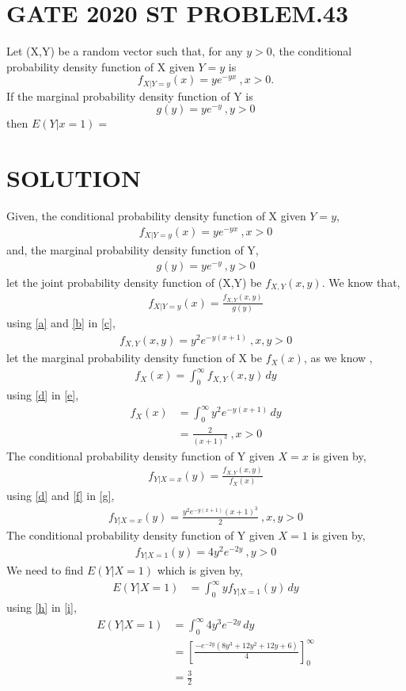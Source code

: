 \documentclass[journal,12pt,twocolumn]{IEEEtran}
\begin{document}
\section{GATE 2020 ST PROBLEM.43}
Let (X,Y) be a random vector such that, for any $y>0$, the conditional probability density function of X given $Y=y$ is $$f_{X|Y=y}(x)=ye^{-yx} \:,x>0. $$ If the marginal probability density function of Y is $$g(y)=ye^{-y}\:,y>0$$ then $E(Y|x=1)=$
\section{SOLUTION}
Given,
the conditional probability density function of X given $Y=y$,
\begin{align}
f_{X|Y=y}(x)=ye^{-yx} \:,x>0 \label{a}
\end{align}
and, the marginal probability density function of Y,
\begin{align}
g(y)=ye^{-y}\:,y>0 \label{b}
\end{align}
let the joint probability density function of (X,Y) be $f_{X,Y}(x,y)$.
We know that,
\begin{align}
f_{X|Y=y}(x)=\frac{f_{X,Y}(x,y)}{g(y)}  \label{c}
\end{align}
using \eqref{a} and \eqref{b} in \eqref{c},
\begin{align}
f_{X,Y}(x,y) =y^{2}e^{-y(x+1)} \:,x,y>0 \label{d}
\end{align}
let the marginal probability density function of X be $f_{X}(x)$,
as we know ,
\begin{align}
f_{X}(x)= \int_{0}^{\infty}{f_{X,Y}(x,y)}\,dy \label{e}
\end{align}
using \eqref{d} in \eqref{e},
\begin{align}
f_{X}(x) &=\int_{0}^{\infty}{y^{2}e^{-y(x+1)}}\,dy\\
&=\frac{2}{(x+1)^{3}} \:,x>0\label{f}
\end{align}
The conditional probability density function of Y given $X=x$ is given by,
\begin{align}
f_{Y|X=x}(y) =\frac{f_{X,Y}(x,y)}{f_{X}(x)} \label{g}
\end{align}
using \eqref{d} and \eqref{f} in \eqref{g},
\begin{align}
 f_{Y|X=x}(y) =\frac{y^{2}e^{-y(x+1)}(x+1)^{3}}{2} \:,x,y>0
\end{align}
The conditional probability density function of Y given $X=1$ is given by,
\begin{align}
 f_{Y|X=1}(y) =4y^{2}e^{-2y}  \:,y>0 \label{h}
\end{align}
We need to find $E(Y|X=1)$ which is given by,
\begin{align}
 E(Y|X=1) &= \int_{0}^{\infty}{yf_{Y|X=1}(y)}\,dy \label{i}
\end{align}
using \eqref{h} in \eqref{i},
\begin{align}
E(Y|X=1) &= \int_{0}^{\infty}{4y^{3}e^{-2y}}\,dy\\
  &= \left[\frac{-e^{-2y}(8y^{3} + 12y^{2} + 12y + 6)}{4}\right]_0^{\infty}\\
        &=\frac{3}{2}
\end{align}
\end{document}
